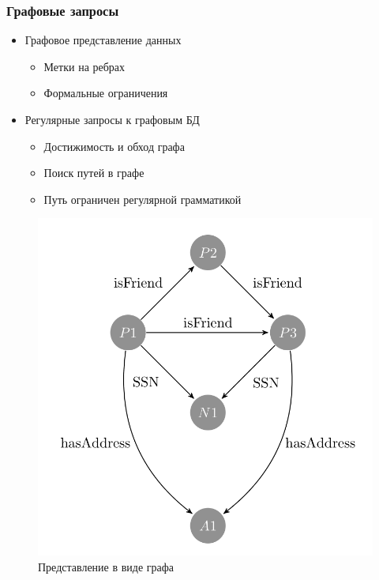 \documentclass{beamer}
\begin{document}
\begin{frame}[fragile]  
  \frametitle{Графовые запросы}
  \noindent\begin{minipage}{0.59\textwidth}
  \begin{itemize}
    \item Графовое представление данных
    \begin{itemize}
        \item Метки на ребрах
        \item Формальные ограничения
    \end{itemize}
    \item Регулярные запросы к графовым БД
    \begin{itemize}
        \item Достижимость и обход графа
        \item Поиск путей в графе
        \item Путь ограничен регулярной грамматикой
    \end{itemize}
  \end{itemize}
  \end{minipage}
  \noindent\begin{minipage}{0.4\textwidth}
  \begin{figure}[h!]
      \includegraphics[width=1\linewidth]{pictures/intro_graph.PNG}
      \caption{Представление в виде графа}
  \end{figure}
\end{minipage}
\end{frame}
\end{document}
